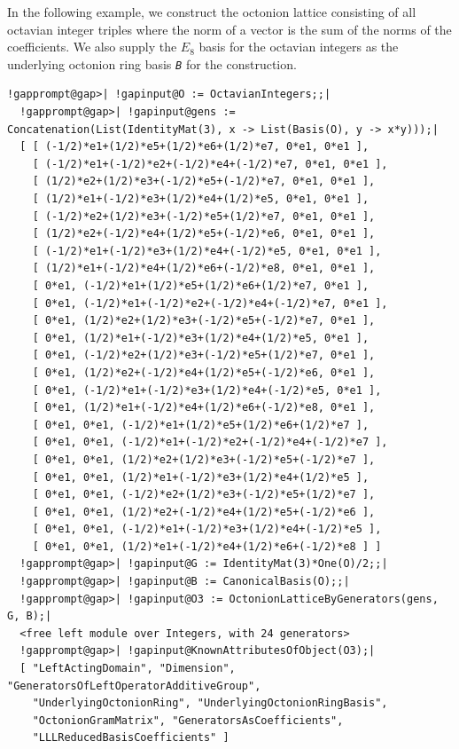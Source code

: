 \documentclass[a4paper,11pt]{report}
\begin{document}
{{{ In the following example, we construct the octonion lattice consisting of all
octavian integer triples where the norm of a vector is the sum of the norms of
the coefficients. We also supply the $E_8$ basis for the octavian integers as the underlying octonion ring basis \mbox{\texttt{\mdseries\slshape B}} for the construction. 
\begin{Verbatim}[commandchars=!@|,fontsize=\small,frame=single,label=Example]
  !gapprompt@gap>| !gapinput@O := OctavianIntegers;;|
  !gapprompt@gap>| !gapinput@gens := Concatenation(List(IdentityMat(3), x -> List(Basis(O), y -> x*y)));|
  [ [ (-1/2)*e1+(1/2)*e5+(1/2)*e6+(1/2)*e7, 0*e1, 0*e1 ],
    [ (-1/2)*e1+(-1/2)*e2+(-1/2)*e4+(-1/2)*e7, 0*e1, 0*e1 ],
    [ (1/2)*e2+(1/2)*e3+(-1/2)*e5+(-1/2)*e7, 0*e1, 0*e1 ],
    [ (1/2)*e1+(-1/2)*e3+(1/2)*e4+(1/2)*e5, 0*e1, 0*e1 ],
    [ (-1/2)*e2+(1/2)*e3+(-1/2)*e5+(1/2)*e7, 0*e1, 0*e1 ],
    [ (1/2)*e2+(-1/2)*e4+(1/2)*e5+(-1/2)*e6, 0*e1, 0*e1 ],
    [ (-1/2)*e1+(-1/2)*e3+(1/2)*e4+(-1/2)*e5, 0*e1, 0*e1 ],
    [ (1/2)*e1+(-1/2)*e4+(1/2)*e6+(-1/2)*e8, 0*e1, 0*e1 ],
    [ 0*e1, (-1/2)*e1+(1/2)*e5+(1/2)*e6+(1/2)*e7, 0*e1 ],
    [ 0*e1, (-1/2)*e1+(-1/2)*e2+(-1/2)*e4+(-1/2)*e7, 0*e1 ],
    [ 0*e1, (1/2)*e2+(1/2)*e3+(-1/2)*e5+(-1/2)*e7, 0*e1 ],
    [ 0*e1, (1/2)*e1+(-1/2)*e3+(1/2)*e4+(1/2)*e5, 0*e1 ],
    [ 0*e1, (-1/2)*e2+(1/2)*e3+(-1/2)*e5+(1/2)*e7, 0*e1 ],
    [ 0*e1, (1/2)*e2+(-1/2)*e4+(1/2)*e5+(-1/2)*e6, 0*e1 ],
    [ 0*e1, (-1/2)*e1+(-1/2)*e3+(1/2)*e4+(-1/2)*e5, 0*e1 ],
    [ 0*e1, (1/2)*e1+(-1/2)*e4+(1/2)*e6+(-1/2)*e8, 0*e1 ],
    [ 0*e1, 0*e1, (-1/2)*e1+(1/2)*e5+(1/2)*e6+(1/2)*e7 ],
    [ 0*e1, 0*e1, (-1/2)*e1+(-1/2)*e2+(-1/2)*e4+(-1/2)*e7 ],
    [ 0*e1, 0*e1, (1/2)*e2+(1/2)*e3+(-1/2)*e5+(-1/2)*e7 ],
    [ 0*e1, 0*e1, (1/2)*e1+(-1/2)*e3+(1/2)*e4+(1/2)*e5 ],
    [ 0*e1, 0*e1, (-1/2)*e2+(1/2)*e3+(-1/2)*e5+(1/2)*e7 ],
    [ 0*e1, 0*e1, (1/2)*e2+(-1/2)*e4+(1/2)*e5+(-1/2)*e6 ],
    [ 0*e1, 0*e1, (-1/2)*e1+(-1/2)*e3+(1/2)*e4+(-1/2)*e5 ],
    [ 0*e1, 0*e1, (1/2)*e1+(-1/2)*e4+(1/2)*e6+(-1/2)*e8 ] ]
  !gapprompt@gap>| !gapinput@G := IdentityMat(3)*One(O)/2;;|
  !gapprompt@gap>| !gapinput@B := CanonicalBasis(O);;|
  !gapprompt@gap>| !gapinput@O3 := OctonionLatticeByGenerators(gens, G, B);|
  <free left module over Integers, with 24 generators>
  !gapprompt@gap>| !gapinput@KnownAttributesOfObject(O3);|
  [ "LeftActingDomain", "Dimension", "GeneratorsOfLeftOperatorAdditiveGroup",
    "UnderlyingOctonionRing", "UnderlyingOctonionRingBasis",
    "OctonionGramMatrix", "GeneratorsAsCoefficients",
    "LLLReducedBasisCoefficients" ]
\end{Verbatim}
 }

}}
\end{document}

